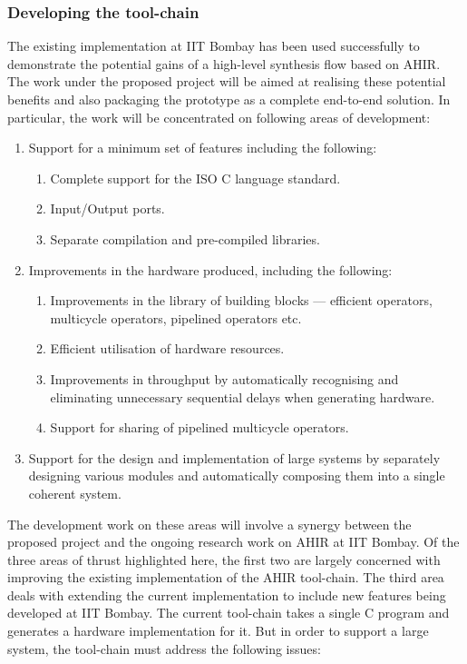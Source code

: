 \documentclass[12pt]{article}
\begin{document}
\subsubsection*{Developing the tool-chain}

The existing implementation at IIT Bombay has been used successfully
to demonstrate the potential gains of a high-level synthesis flow
based on AHIR. The work under the proposed project will be aimed at
realising these potential benefits and also packaging the prototype as
a complete end-to-end solution. In particular, the work will be
concentrated on following areas of development:

\begin{enumerate}
\item Support for a minimum set of features including the following:
  \begin{enumerate}
  \item Complete support for the ISO C language standard.
  \item Input/Output ports.
  \item Separate compilation and pre-compiled libraries.
  \end{enumerate}
\item Improvements in the hardware produced, including the following:
  \begin{enumerate}
  \item Improvements in the library of building blocks --- efficient
    operators, multicycle operators, pipelined operators etc.
  \item Efficient utilisation of hardware resources.
  \item Improvements in throughput by automatically recognising and
    eliminating unnecessary sequential delays when generating
    hardware.
  \item Support for sharing of pipelined multicycle operators.
  \end{enumerate}
\item Support for the design and implementation of large systems by
  separately designing various modules and automatically composing
  them into a single coherent system.
\end{enumerate}

The development work on these areas will involve a synergy between the
proposed project and the ongoing research work on AHIR at IIT Bombay.
Of the three areas of thrust highlighted here, the first two are
largely concerned with improving the existing implementation of the
AHIR tool-chain. The third area deals with extending the current
implementation to include new features being developed at IIT Bombay.
The current tool-chain takes a single C program and generates a
hardware implementation for it. But in order to support a large
system, the tool-chain must address the following issues:
\end{document}
